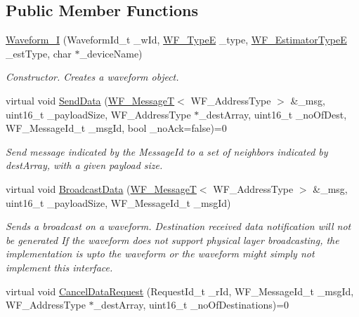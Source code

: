 \subsection*{Public Member Functions}
\begin{DoxyCompactItemize}
\item 
\hyperlink{class_waveform_1_1_waveform___i_a98959d954f80b314ef896d2f857b7e4c}{Waveform\+\_\+I} (Waveform\+Id\+\_\+t \+\_\+w\+Id, \hyperlink{namespace_waveform_a8362d1abeefedecd1142a174faedc096}{W\+F\+\_\+\+TypeE} \+\_\+type, \hyperlink{namespace_waveform_a264307e95d31e27c5a69031fd2615f98}{W\+F\+\_\+\+Estimator\+TypeE} \+\_\+est\+Type, char $\ast$\+\_\+device\+Name)
\begin{DoxyCompactList}\small\item\em Constructor. Creates a waveform object. \end{DoxyCompactList}\item 
virtual void \hyperlink{class_waveform_1_1_waveform___i_ab651687e82a54481718d2ee75e40ec53}{Send\+Data} (\hyperlink{class_waveform_1_1_w_f___message_t}{W\+F\+\_\+\+MessageT}$<$ W\+F\+\_\+\+Address\+Type $>$ \&\+\_\+msg, uint16\+\_\+t \+\_\+payload\+Size, W\+F\+\_\+\+Address\+Type $\ast$\+\_\+dest\+Array, uint16\+\_\+t \+\_\+no\+Of\+Dest, W\+F\+\_\+\+Message\+Id\+\_\+t \+\_\+msg\+Id, bool \+\_\+no\+Ack=false)=0
\begin{DoxyCompactList}\small\item\em Send message indicated by the Message\+Id to a set of neighbors indicated by dest\+Array, with a given payload size. \end{DoxyCompactList}\item 
virtual void \hyperlink{class_waveform_1_1_waveform___i_ac2ddb96d5fb3c8cd410f688acde95389}{Broadcast\+Data} (\hyperlink{class_waveform_1_1_w_f___message_t}{W\+F\+\_\+\+MessageT}$<$ W\+F\+\_\+\+Address\+Type $>$ \&\+\_\+msg, uint16\+\_\+t \+\_\+payload\+Size, W\+F\+\_\+\+Message\+Id\+\_\+t \+\_\+msg\+Id)
\begin{DoxyCompactList}\small\item\em Sends a broadcast on a waveform. Destination received data notification will not be generated If the waveform does not support physical layer broadcasting, the implementation is upto the waveform or the waveform might simply not implement this interface. \end{DoxyCompactList}\item 
virtual void \hyperlink{class_waveform_1_1_waveform___i_a0dc200e92cdff86e55d65ab270c988e6}{Cancel\+Data\+Request} (Request\+Id\+\_\+t \+\_\+r\+Id, W\+F\+\_\+\+Message\+Id\+\_\+t \+\_\+msg\+Id, W\+F\+\_\+\+Address\+Type $\ast$\+\_\+dest\+Array, uint16\+\_\+t \+\_\+no\+Of\+Destinations)=0

\end{DoxyCompactItemize}
